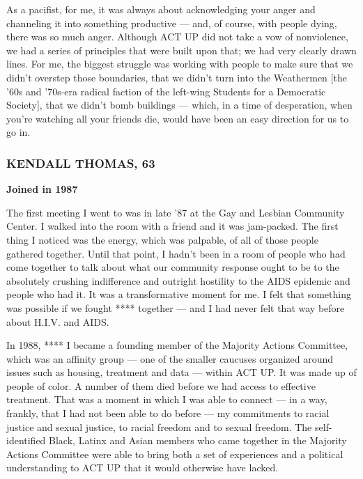 As a pacifist, for me, it was always about acknowledging your anger and
channeling it into something productive --- and, of course, with people
dying, there was so much anger. Although ACT UP did not take a vow of
nonviolence, we had a series of principles that were built upon that; we
had very clearly drawn lines. For me, the biggest struggle was working
with people to make sure that we didn't overstep those boundaries, that
we didn't turn into the Weathermen {[}the '60s and '70s-era radical
faction of the left-wing Students for a Democratic Society{]}, that we
didn't bomb buildings --- which, in a time of desperation, when you're
watching all your friends die, would have been an easy direction for us
to go in.

\hypertarget{kendall-thomas-63}{%
\subsubsection{KENDALL THOMAS, 63}\label{kendall-thomas-63}}

\textbf{Joined in 1987}

The first meeting I went to was in late '87 at the Gay and Lesbian
Community Center. I walked into the room with a friend and it was
jam-packed. The first thing I noticed was the energy, which was
palpable, of all of those people gathered together. Until that point, I
hadn't been in a room of people who had come together to talk about what
our community response ought to be to the absolutely crushing
indifference and outright hostility to the AIDS epidemic and people who
had it. It was a transformative moment for me. I felt that something was
possible if we fought **** together --- and I had never felt that way
before about H.I.V. and AIDS.

In 1988, **** I became a founding member of the Majority Actions
Committee, which was an affinity group --- one of the smaller caucuses
organized around issues such as housing, treatment and data --- within
ACT UP. It was made up of people of color. A number of them died before
we had access to effective treatment. That was a moment in which I was
able to connect --- in a way, frankly, that I had not been able to do
before --- my commitments to racial justice and sexual justice, to
racial freedom and to sexual freedom. The self-identified Black, Latinx
and Asian members who came together in the Majority Actions Committee
were able to bring both a set of experiences and a political
understanding to ACT UP that it would otherwise have lacked.

